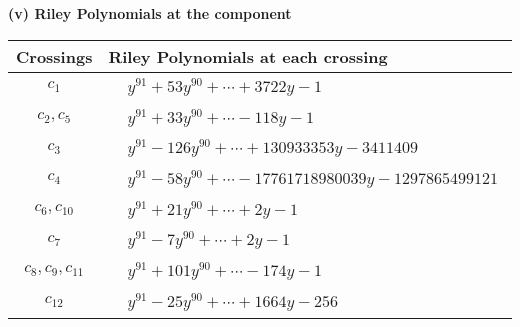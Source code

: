 \documentclass[1p]{elsarticle_modified}
\theoremstyle{definition}
\begin{document}
\newpage\renewcommand{\arraystretch}{1}
\flushleft \textbf{(v) Riley Polynomials at the component}\newline \\
\begin{tabular}{m{50pt}|m{274pt}}
Crossings & \hspace{64pt}Riley Polynomials at each crossing \\
\hline $$\begin{aligned}c_{1}\end{aligned}$$&$\begin{aligned}
&y^{91}+53 y^{90}+\cdots+3722 y-1
\end{aligned}$\\
\hline $$\begin{aligned}c_{2},c_{5}\end{aligned}$$&$\begin{aligned}
&y^{91}+33 y^{90}+\cdots-118 y-1
\end{aligned}$\\
\hline $$\begin{aligned}c_{3}\end{aligned}$$&$\begin{aligned}
&y^{91}-126 y^{90}+\cdots+130933353 y-3411409
\end{aligned}$\\
\hline $$\begin{aligned}c_{4}\end{aligned}$$&$\begin{aligned}
&y^{91}-58 y^{90}+\cdots-17761718980039 y-1297865499121
\end{aligned}$\\
\hline $$\begin{aligned}c_{6},c_{10}\end{aligned}$$&$\begin{aligned}
&y^{91}+21 y^{90}+\cdots+2 y-1
\end{aligned}$\\
\hline $$\begin{aligned}c_{7}\end{aligned}$$&$\begin{aligned}
&y^{91}-7 y^{90}+\cdots+2 y-1
\end{aligned}$\\
\hline $$\begin{aligned}c_{8},c_{9},c_{11}\end{aligned}$$&$\begin{aligned}
&y^{91}+101 y^{90}+\cdots-174 y-1
\end{aligned}$\\
\hline $$\begin{aligned}c_{12}\end{aligned}$$&$\begin{aligned}
&y^{91}-25 y^{90}+\cdots+1664 y-256
\end{aligned}$\\
\hline
\end{tabular}\\~\\
\end{document}
